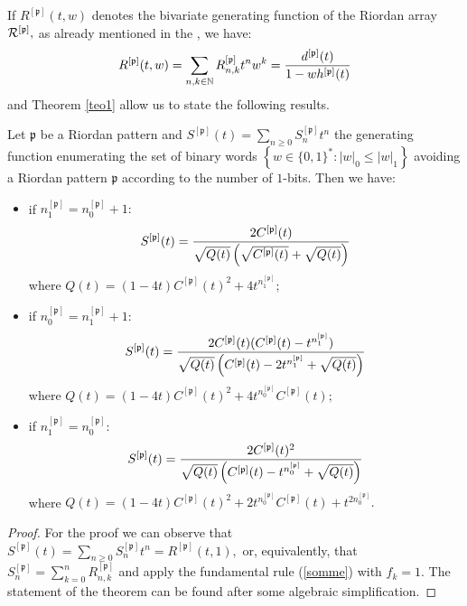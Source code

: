 If $R^{[\mathfrak{p}]}(t,w)$ denotes the bivariate generating function of the
Riordan array ${\cal{R}^{[\mathfrak{p}]}},$ as already mentioned in the
, we have:
$$R^{[\mathfrak{p}]}(t,w)=\sum_{n,k\in\mathbb{N}} R_{n, k}^{[\mathfrak{p}]}t^n
w^k={d^{[\mathfrak{p}]}(t) \over 1-wh^{[\mathfrak{p}]}(t)}$$ and Theorem
\ref{teo1} allow us to state the following results.

\begin{theorem}
\label{teo2}
Let $\mathfrak{p}$ be  a Riordan pattern and $S^{[\mathfrak{p}]}(t)=\sum_{n\geq
0}S_n^{[\mathfrak{p}]}t^n$ the generating function enumerating the set of binary words $\left\lbrace w\in
\lbrace 0,1 \rbrace^{*}: |w|_0\leq |w|_1\right\rbrace$ avoiding  a Riordan
pattern $\mathfrak{p}$ according to the number of $1$-bits. Then we have:

\begin{itemize}

\item if $n_1^{[\mathfrak{p}]}=n_0^{[\mathfrak{p}]}+1:$
$$S^{[\mathfrak{p}]}(t)={2C^{[\mathfrak{p}]}(t) \over \sqrt{Q(t)}\left(\sqrt{C^{[\mathfrak{p}]}(t)}+ \sqrt{Q(t)} \right)} $$
    where $Q(t)={(1-4t)C^{[\mathfrak{p}]}(t)^2+4t^{n_1^{[\mathfrak{p}]}}};$

\item if $n_0^{[\mathfrak{p}]}=n_1^{[\mathfrak{p}]}+1:$
$$S^{[\mathfrak{p}]}(t)={2C^{[\mathfrak{p}]}(t)(C^{[\mathfrak{p}]}(t)-t^{n_1^{[\mathfrak{p}]}}
) \over \sqrt{Q(t)} \left(C^{[\mathfrak{p}]}(t)-2t^{n_1^{[\mathfrak{p}]}}+ \sqrt{Q(t)} \right) }$$
    where $Q(t)={ (1-4t)C^{[\mathfrak{p}]}(t)^2+4t^{n_0^{[\mathfrak{p}]}}C^{[\mathfrak{p}]}(t)};$

\item if $n_1^{[\mathfrak{p}]}=n_0^{[\mathfrak{p}]}:$
$$S^{[\mathfrak{p}]}(t)={2C^{[\mathfrak{p}]}(t)^2 \over \sqrt{Q(t)}
    \left(C^{[\mathfrak{p}]}(t)-t^{n_0^{[\mathfrak{p}]}}+ \sqrt{Q(t)} \right) }$$
where $Q(t)=(1-4t)C^{[\mathfrak{p}]}(t)^2+2t^{n_0^{[\mathfrak{p}]}}C^{[\mathfrak{p}]}(t)+t^{2n_0^{[\mathfrak{p}]}}.$

\end{itemize}
\end{theorem}
\begin{proof}
For the proof we can observe that $S^{[\mathfrak{p}]}(t)=\sum_{n\geq
0}S_n^{[\mathfrak{p}]}t^n=R^{[\mathfrak{p}]}(t,1),$ or, equivalently, that
$S_n^{[\mathfrak{p}]}=\sum_{k=0}^nR_{n, k}^{[\mathfrak{p}]}$ and apply the
fundamental rule (\ref{somme}) with $f_k=1.$ The statement of the theorem can
be found after some algebraic simplification.
\end{proof}

